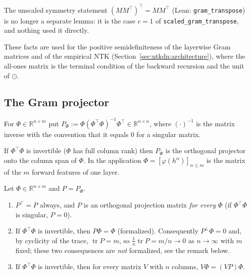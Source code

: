 \begin{remark}\label{rmk:ntkcond:gramChange}
The unscaled symmetry statement $(MM^\top)^\top=MM^\top$ (Lean: \texttt{gram\_transpose}) is no longer a separate lemma: it is the case $c=1$ of \texttt{scaled\_gram\_transpose}, and nothing used it directly.
\end{remark}


These facts are used for the positive semidefiniteness of the layerwise Gram matrices and of the empirical NTK (Section~\ref{sec:ntkdn:architecture}), where the all-ones matrix is the terminal condition of the backward recursion and the unit of $\odot$.

\subsection{The Gram projector}

\begin{definition}\label{def:ntkcond:gramProjector}
  \leanok
For $\Phi\in\mathbb R^{n\times m}$ put $P_\Phi:=\Phi(\Phi^\top\Phi)^{-1}\Phi^\top\in\mathbb R^{n\times n}$, where $(\cdot)^{-1}$ is the matrix inverse with the convention that it equals $0$ for a singular matrix.
\end{definition}

If $\Phi^\top\Phi$ is invertible ($\Phi$ has full column rank) then $P_\Phi$ is the orthogonal projector onto the column span of $\Phi$. In the application $\Phi=[\varphi(h^\alpha)]_{\alpha\le m}$ is the matrix of the $m$ forward features of one layer.

\begin{lemma}\label{lem:ntkcond:gramProjectorProps}
  \leanok
Let $\Phi\in\mathbb R^{n\times m}$ and $P=P_\Phi$.
\begin{enumerate}
  \item $P^\top=P$ always, and $P$ is an orthogonal projection matrix \emph{for every} $\Phi$ (if $\Phi^\top\Phi$ is singular, $P=0$).
  \item If $\Phi^\top\Phi$ is invertible, then $P\Phi=\Phi$ (formalized). Consequently $P^\perp\Phi=0$ and, by cyclicity of the trace, $\operatorname{tr}P=m$, so $\tfrac1n\operatorname{tr}P=m/n\to0$ as $n\to\infty$ with $m$ fixed; these two consequences are \emph{not} formalized, see the remark below.
  \item If $\Phi^\top\Phi$ is invertible, then for every matrix $V$ with $n$ columns, $V\Phi=(VP)\Phi$.
\end{enumerate}
\end{lemma}

